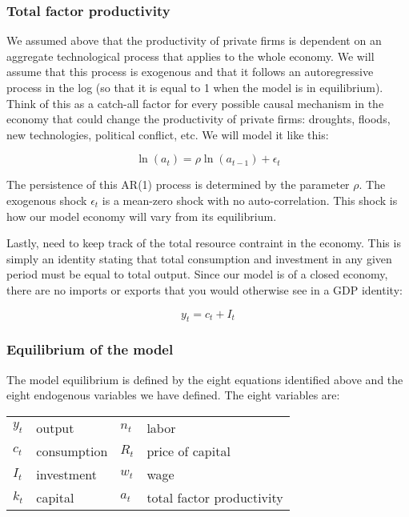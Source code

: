 \documentclass[12pt]{article}
\begin{document}
\subsubsection{Total factor productivity}

We assumed above that the productivity of private firms is dependent on an aggregate technological process that applies to the whole economy. We will assume that this process is exogenous and that it follows an autoregressive process in the log (so that it is equal to 1 when the model is in equilibrium). Think of this as a catch-all factor for every possible causal mechanism in the economy that could change the productivity of private firms: droughts, floods, new technologies, political conflict, etc. We will model it like this:

\begin{equation}
\ln(a_t) = \rho \ln(a_{t-1}) + \epsilon_t
\end{equation}

The persistence of this AR(1) process is determined by the parameter \(\rho\). The exogenous shock \(\epsilon_t\) is a mean-zero shock with no auto-correlation. This shock is how our model economy will vary from its equilibrium.

Lastly, need to keep track of the total resource contraint in the economy. This is simply an identity stating that total consumption and investment in any given period must be equal to total output. Since our model is of a closed economy, there are no imports or exports that you would otherwise see in a GDP identity:

\begin{equation}
y_t = c_t + I_t
\end{equation}

\subsubsection{Equilibrium of the model}

The model equilibrium is defined by the eight equations identified above and the eight endogenous variables we have defined. The eight variables are:

\begin{center}
\begin{tabular}{llll}
	\(y_t\) & output & \(n_t\) & labor \\
	\(c_t\) & consumption & \(R_t\) & price of capital \\
	\(I_t\) & investment & \(w_t\) & wage \\
	\(k_t\) & capital & \(a_t\) & total factor productivity \\
\end{tabular}
\end{center}
\end{document}
